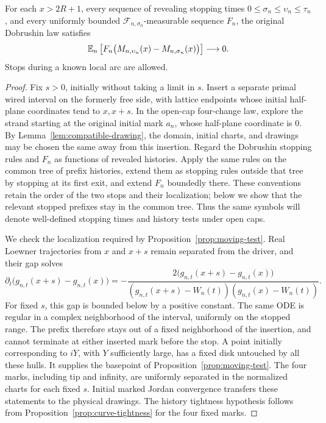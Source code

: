 \begin{lemma}
\label{lem:bounded-martingale-tests}
For each $x>2R+1$, every sequence of revealing stopping times
$0\le\sigma_n\le\upsilon_n\le\tau_n$, and every uniformly bounded
$\mathcal F_{n,\sigma_n}$-measurable sequence $F_n$, the original
Dobrushin law satisfies
\begin{equation}\label{eq:approximate-martingale}
 \mathbb E_n\left[
 F_n\bigl(M_{n,\upsilon_n}(x)-M_{n,\sigma_n}(x)\bigr)
 \right]\longrightarrow0.
\end{equation}
Stops during a known local arc are allowed.
\end{lemma}

\begin{proof}
Fix $s>0$, initially without taking a limit in $s$.  Insert a
separate primal wired interval on the formerly free side, with
lattice endpoints whose initial half-plane coordinates tend to
$x,x+s$.  In the open-cap four-change law, explore the strand
starting at the original initial mark $a_n$, whose half-plane
coordinate is $0$.  By
Lemma~\ref{lem:compatible-drawing}, the domain, initial charts,
and drawings may be chosen the same away from this insertion.
Regard the Dobrushin stopping rules and $F_n$ as functions of
revealed histories.  Apply the same rules on the common tree of
prefix histories, extend them as stopping rules outside that tree
by stopping at its first exit, and extend $F_n$ boundedly there.
These conventions retain the order of the two stops and their
localization; below we show that the relevant stopped prefixes
stay in the common tree.  Thus the same symbols will denote
well-defined stopping times and history tests under open caps.

We check the localization required by
Proposition~\ref{prop:moving-test}.  Real Loewner trajectories from
$x$ and $x+s$ remain separated from the driver, and their gap solves
\begin{equation}\label{eq:real-gap}
 \partial_t\bigl(g_{n,t}(x+s)-g_{n,t}(x)\bigr)
 =-\frac{2\bigl(g_{n,t}(x+s)-g_{n,t}(x)\bigr)}
 {(g_{n,t}(x+s)-W_n(t))(g_{n,t}(x)-W_n(t))}.
\end{equation}
For fixed $s$, this gap is bounded below by a positive constant.
The same ODE is regular in a complex neighborhood of the interval,
uniformly on the stopped range.  The prefix therefore stays out
of a fixed neighborhood of the insertion, and cannot terminate
at either inserted mark before the stop.  A point initially
corresponding to $iY$, with $Y$ sufficiently large, has a fixed
disk untouched by all these hulls.  It supplies the basepoint of
Proposition~\ref{prop:moving-test}.  The four marks, including tip
and infinity, are uniformly separated in the normalized charts
for each fixed $s$.  Initial marked Jordan convergence transfers
these statements to the physical drawings.  The history
tightness hypothesis follows from
Proposition~\ref{prop:curve-tightness} for the four fixed marks.


\end{proof}
